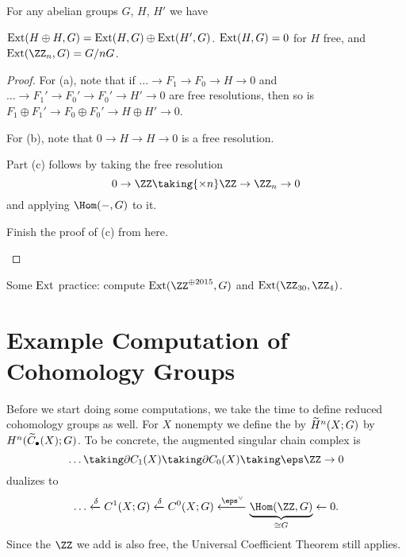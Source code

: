 \documentclass[11pt]{scrreprt}
\begin{document}

\begin{lemma}
	For any abelian groups $G$, $H$, $H'$ we have
	\begin{enumerate}[(a)]
		\ii $\operatorname{Ext}(H \oplus H, G) = \operatorname{Ext}(H, G) \oplus \operatorname{Ext}(H', G)$.
		\ii $\operatorname{Ext}(H,G) = 0$ for $H$ free, and
		\ii $\Ext(\Zc n, G) = G / nG$.
	\end{enumerate}
\end{lemma}
\begin{proof}
	For (a), note that if $\dots \to F_1 \to F_0 \to H \to 0$
	and $\dots \to F_1' \to F_0' \to F_0' \to H' \to 0$ are free resolutions,
	then so is $F_1 \oplus F_1' \to F_0 \oplus F_0' \to H \oplus H' \to 0$.

	For (b), note that $0 \to H \to H \to 0$ is a free resolution.
	
	Part (c) follows by taking the free resolution
	\[ 0 \to \ZZ \taking{\times n} \ZZ \to \Zc n \to 0 \]
	and applying $\Hom(-,G)$ to it.
	\begin{ques}
		Finish the proof of (c) from here. \qedhere
	\end{ques}
\end{proof}

\begin{ques}
	Some $\operatorname{Ext}$ practice: compute
	$\Ext(\ZZ^{\oplus 2015}, G)$ and $\Ext(\Zc{30}, \Zc 4)$.
\end{ques}

\section{Example Computation of Cohomology Groups}
Before we start doing some computations, we take the time
to define reduced cohomology groups as well.
For $X$ nonempty we define the  by $\widetilde H^n(X;G)$
by $H^n(\widetilde C_\bullet(X); G)$.
To be concrete, the augmented singular chain complex is
\[ \dots \taking\partial C_1(X) \taking\partial C_0(X) \taking\eps \ZZ \to 0 \]
dualizes to
\[
	\dots \xleftarrow\delta C^1(X;G) \xleftarrow\delta C^0(X;G)
	\xleftarrow{\eps^\vee} \underbrace{\Hom(\ZZ, G)}_{\cong G}
	\leftarrow 0.
\]
Since the $\ZZ$ we add is also free,
the Universal Coefficient Theorem still applies.
\end{document}
